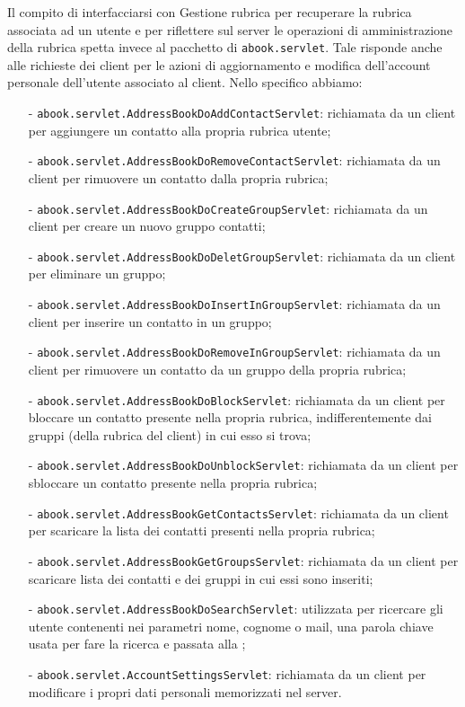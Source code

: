 \begin{description}
Il compito di interfacciarsi con \textsf{Gestione rubrica} per recuperare la rubrica associata ad un utente e per riflettere sul server le operazioni di amministrazione della rubrica spetta invece al pacchetto di  \texttt{abook.servlet}. Tale  risponde anche alle richieste dei client per le azioni di aggiornamento e modifica dell'account personale dell'utente associato al client. Nello specifico abbiamo:

\begin{itemize}
	  \item[-] \texttt{abook.servlet.AddressBookDoAddContactServlet}: richiamata da un client per aggiungere un contatto alla propria rubrica utente;
	  \item[-] \texttt{abook.servlet.AddressBookDoRemoveContactServlet}: richiamata da un client per rimuovere un contatto dalla propria rubrica;
	  \item[-] \texttt{abook.servlet.AddressBookDoCreateGroupServlet}: richiamata da un client per creare un nuovo gruppo contatti;
	  \item[-] \texttt{abook.servlet.AddressBookDoDeletGroupServlet}: richiamata da un client per eliminare un gruppo;
	  \item[-] \texttt{abook.servlet.AddressBookDoInsertInGroupServlet}: richiamata da un client per inserire un contatto in un gruppo;
	  \item[-] \texttt{abook.servlet.AddressBookDoRemoveInGroupServlet}: richiamata da un client per rimuovere un contatto da un gruppo della propria rubrica;
	  \item[-] \texttt{abook.servlet.AddressBookDoBlockServlet}: richiamata da un client per bloccare un contatto presente nella propria rubrica, indifferentemente dai gruppi (della rubrica del client) in cui esso si trova;
	  \item[-] \texttt{abook.servlet.AddressBookDoUnblockServlet}: richiamata da un client per sbloccare un contatto presente nella propria rubrica;
	  \item[-] \texttt{abook.servlet.AddressBookGetContactsServlet}: richiamata da un client per scaricare la lista dei contatti presenti nella propria rubrica;
	  \item[-] \texttt{abook.servlet.AddressBookGetGroupsServlet}: richiamata da un client per scaricare lista dei contatti e dei gruppi in cui essi sono inseriti;
	  \item[-] \texttt{abook.servlet.AddressBookDoSearchServlet}: utilizzata per ricercare gli utente contenenti nei parametri nome, cognome o mail, una parola chiave usata per fare la ricerca e passata alla ;
	  \item[-] \texttt{abook.servlet.AccountSettingsServlet}: richiamata da un client per modificare i propri dati personali memorizzati nel server.
\end{itemize}


\end{description}
